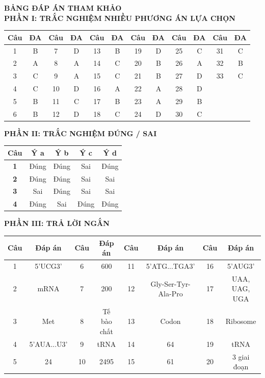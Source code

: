 \documentclass{article}
\begin{document}
\begin{minipage}[t][14.4cm][t]{\linewidth}
\fontsize{19}{25}\selectfont
\begin{center}
{\fontsize{26}{34}\selectfont \textbf{\color{brandRed}BẢNG ĐÁP ÁN THAM KHẢO}}\\[10pt]
\textbf{\color{brandBlue}PHẦN I: TRẮC NGHIỆM NHIỀU PHƯƠNG ÁN LỰA CHỌN}\\[4pt]
\begin{tabular}{|c|c||c|c||c|c||c|c||c|c||c|c|}
\hline
\textbf{Câu} & \textbf{ĐA} & \textbf{Câu} & \textbf{ĐA} & \textbf{Câu} & \textbf{ĐA} & \textbf{Câu} & \textbf{ĐA} & \textbf{Câu} & \textbf{ĐA} & \textbf{Câu} & \textbf{ĐA}\\
\hline
1 & B & 7 & D & 13 & B & 19 & D & 25 & C & 31 & C\\
2 & A & 8 & A & 14 & C & 20 & B & 26 & A & 32 & B\\
3 & C & 9 & A & 15 & C & 21 & B & 27 & D & 33 & C\\
4 & C & 10 & D & 16 & A & 22 & A & 28 & D & & \\
5 & B & 11 & C & 17 & B & 23 & A & 29 & B & & \\
6 & B & 12 & D & 18 & C & 24 & D & 30 & C & & \\
\hline
\end{tabular}

\vspace{10pt}
\textbf{\color{brandBlue}PHẦN II: TRẮC NGHIỆM ĐÚNG / SAI}\\[4pt]
\begin{tabular}{|c|c|c|c|c|}
\hline
\textbf{Câu} & \textbf{Ý a} & \textbf{Ý b} & \textbf{Ý c} & \textbf{Ý d}\\
\hline
\textbf{1} & Đúng & Đúng & Sai & Đúng\\
\textbf{2} & Đúng & Đúng & Sai & Sai\\
\textbf{3} & Sai & Đúng & Sai & Sai\\
\textbf{4} & Đúng & Sai & Đúng & Đúng\\
\hline
\end{tabular}

\vspace{10pt}
\textbf{\color{brandBlue}PHẦN III: TRẢ LỜI NGẮN}\\[4pt]
\begin{tabular}{|c|c||c|c||c|c||c|c|}
\hline
\textbf{Câu} & \textbf{Đáp án} & \textbf{Câu} & \textbf{Đáp án} & \textbf{Câu} & \textbf{Đáp án} & \textbf{Câu} & \textbf{Đáp án}\\
\hline
1 & 5'UCG3' & 6 & 600 & 11 & 5'ATG...TGA3' & 16 & 5'AUG3'\\
2 & mRNA & 7 & 200 & 12 & Gly-Ser-Tyr-Ala-Pro & 17 & UAA, UAG, UGA\\
3 & Met & 8 & Tế bào chất & 13 & Codon & 18 & Ribosome\\
4 & 5'AUA...U3' & 9 & tRNA & 14 & 64 & 19 & tRNA\\
5 & 24 & 10 & 2495 & 15 & 61 & 20 & 3 giai đoạn\\
\hline
\end{tabular}
\end{center}
\end{minipage}
\newpage
\end{document}
